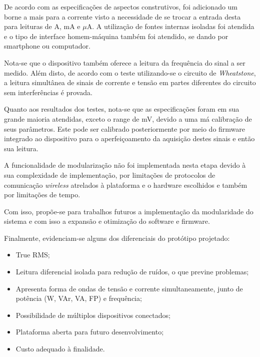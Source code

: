 De acordo com as especificações de aspectos construtivos, foi adicionado um borne a mais para a corrente visto a necessidade de se trocar a entrada desta para leituras de A, mA e $\mu$A. A utilização de fontes internas isoladas foi atendida e o tipo de interface homem-máquina também foi atendido, se dando por smartphone ou computador.

Nota-se que o dispositivo também oferece a leitura da frequência do sinal a ser medido. Além disto, de acordo com o teste utilizando-se o circuito de \textit{Wheatstone}, a leitura simultânea de sinais de corrente e tensão em partes diferentes do circuito sem interferências é provada.

Quanto aos resultados dos testes, nota-se que as especificações foram em sua grande maioria atendidas, exceto o range de mV, devido a uma má calibração de seus parâmetros. Este pode ser calibrado posteriormente por meio do firmware integrado ao dispositivo para o aperfeiçoamento da aquisição destes sinais e então sua leitura.

A funcionalidade de modularização não foi implementada nesta etapa devido à sua complexidade de implementação, por limitações de protocolos de comunicação \textit{wireless} atrelados à plataforma e o hardware escolhidos e também por limitações de tempo. 

Com isso, propõe-se para trabalhos futuros a implementação da modularidade do sistema e com isso a expansão e otimização do software e firmware.

Finalmente, evidenciam-se alguns dos diferenciais do protótipo projetado:

\begin{itemize}
    \item True RMS;
    \item Leitura diferencial isolada para redução de ruídos, o que previne problemas;
    \item Apresenta forma de ondas de tensão e corrente simultaneamente, junto de potência (W, VAr, VA, FP) e frequência;
    \item Possibilidade de múltiplos dispositivos conectados;
    \item Plataforma aberta para futuro desenvolvimento;
    \item Custo adequado à finalidade.
\end{itemize}